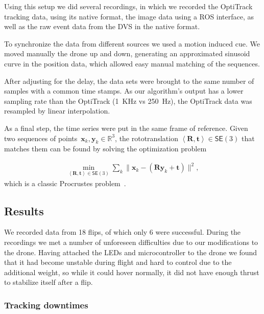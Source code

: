 Using this setup we did several recordings, in which we recorded the
OptiTrack tracking data, using its native format, the image data using
a ROS interface, as well as the raw event data from the DVS in the
native format. 

To synchronize the data from different sources we used a motion induced
cue. We moved manually the drone up and down, generating an approximated
sinusoid curve in the position data, which allowed easy manual matching
of the sequences.

After adjusting for the delay, the data sets were brought to the same
number of samples with a common time stamps. As our algorithm's output
has a lower sampling rate than the OptiTrack (1~KHz vs 250~Hz),
the OptiTrack data was resampled by linear interpolation.



As a final step, the time series were put in the same frame of reference.
Given two sequences of points~$\boldsymbol{x}_{k},\boldsymbol{y}_{k}\in\mathbb{R}^{3}$,
the rototranslation $\left\langle \boldsymbol{R},\boldsymbol{t}\right\rangle \in\mathsf{SE}(3)$
that matches them can be found by solving the optimization problem

\begin{equation}
\begin{aligned}\min_{\left\langle \boldsymbol{R},\boldsymbol{t}\right\rangle \in\mathsf{SE}(3)}\sum_{k}\|\boldsymbol{x}_{k}-(\boldsymbol{R}\boldsymbol{y}_{k}+\boldsymbol{t})\|^{2},\end{aligned}
\label{eq:leastsquares}
\end{equation}
which is a classic Procrustes problem~\cite{gower04procrustes}.




\subsection{Results \label{sec:evaluation}}

We recorded data from 18 flips, of which only 6 were successful. During
the recordings we met a number of unforeseen difficulties due to our
modifications to the drone. Having attached the LEDs and microcontroller
to the drone we found that it had become unstable during flight and
hard to control due to the additional weight, so while it could hover
normally, it did not have enough thrust to stabilize itself after
a flip.




\subsubsection{Tracking downtimes\label{sec:trackingspeed}}

